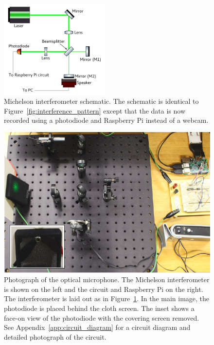\documentclass[paper-main.tex]{subfiles}
\begin{document}
\begin{figure}
	\includegraphics[width=0.49\textwidth]{figures/ifo_schematic_photodiode_edit.pdf}
	\caption{
Michelson interferometer schematic. 
The schematic is identical to Figure~\ref{fig:interference_pattern} except that the data is now recorded using a photodiode and Raspberry Pi instead of a webcam. 
}
	\label{fig:ifo_schematic_podo}
\end{figure}

\begin{figure}
	\includegraphics[width=.6\textwidth]{figures/setup_pic2.pdf}
\caption{Photograph of the optical microphone. The Michelson interferometer is shown on the left and the circuit and Raspberry Pi on the right. The interferometer is laid out as in Figure~\ref{fig:ifo_schematic_podo}. In the main image, the photodiode is placed behind the cloth screen. The inset shows a face-on view of the photodiode with the covering screen removed. See Appendix~\ref{app:circuit_diagram} for a circuit diagram and detailed photograph of the circuit.}
	\label{fig:setup_pic2}
\end{figure}
\end{document}
